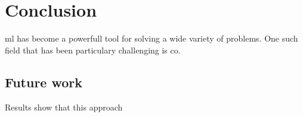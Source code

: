 \chapter{Conclusion}

\gls{ml} has become a powerfull tool for solving a wide variety of problems. One such field that has been particulary challenging is \gls{co}. 

\section{Future work}

Results show that this approach

